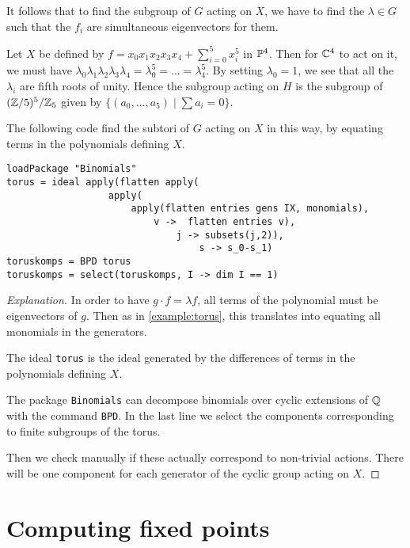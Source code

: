 It follows that to find the subgroup of $G$ acting on $X$, we have to find the $\lambda \in G$ such that the $f_i$ are simultaneous eigenvectors for them.

\begin{example}
\label{example:torus}
Let  $X$ be defined by $f = x_0x_1x_2x_3x_4+\sum_{i=0}^5 x_i^5$ in $\P^4$. Then for $\C^4$ to act on it, we must have $\lambda_0\lambda_1\lambda_2\lambda_3\lambda_4=\lambda_0^5=\ldots=\lambda_4^5$. By setting $\lambda_0=1$, we see that all the $\lambda_i$ are fifth roots of unity. Hence the subgroup acting on $H$ is the subgroup of $(\Z/5)^5/\Z_5$ given by $\{ (a_0,\ldots,a_5) \mid \sum a_i = 0 \}$.
\end{example}

The following code find the subtori of $G$ acting on $X$ in this way, by equating terms in the polynomials defining $X$.

\begin{lstlisting}[language=Macaulay2]
loadPackage "Binomials"
torus = ideal apply(flatten apply(
                  apply(
                      apply(flatten entries gens IX, monomials),
                          v ->  flatten entries v), 
                              j -> subsets(j,2)),
                                  s -> s_0-s_1)
toruskomps = BPD torus
toruskomps = select(toruskomps, I -> dim I == 1)
\end{lstlisting}

\begin{proof}[Explanation]
In order to have $g \cdot f = \lambda f$, all terms of the polynomial must be eigenvectors of $g$. Then as in \cref{example:torus},  this translates into equating all monomials in the generators.

The ideal \texttt{torus} is the ideal generated by the differences of terms in the polynomials defining $X$.

The \MM package \texttt{Binomials} \cite{kahle_binomials} can decompose binomials over cyclic extensions of $\Q$ with the command \texttt{BPD}. In the last line we select the components corresponding to finite subgroups of the torus.

Then we check manually if these actually correspond to non-trivial actions. There will be one component for each generator of the cyclic group acting on $X$.
\end{proof}

\section{Computing fixed points}

